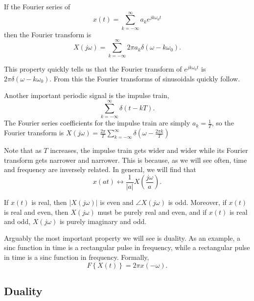 If the Fourier series of
\begin{equation}
    x(t) = \sum_{k=-\infty}^{\infty} a_k e^{jk\omega_0 t}
\end{equation}
then the Fourier transform is
\begin{equation}
    X(j\omega) = \sum_{k=-\infty}^{\infty} 2\pi a_k \delta(\omega - k\omega_0).
\end{equation}

This property quickly tells us that the Fourier transform
of $e^{jk\omega_0 t}$ is $2\pi \delta(\omega-k\omega_0)$.
From this the Fourier transforms of sinusoidals quickly follow.

Another important periodic signal is the impulse train,
\begin{equation}
    \sum_{k=-\infty}^{\infty} \delta(t - kT).
\end{equation}
The Fourier series coefficients for
the impulse train are simply $a_k = \frac{1}{T}$,
so the Fourier transform is
$X(j\omega) = \frac{2\pi}{T} \sum_{k=-\infty}^{\infty} \delta(\omega - \frac{2\pi k}{T})$

Note that as $T$ increases, the impulse train gets wider
and wider while its Fourier transform gets narrower and
narrower. This is because, as we will see often, time and
frequency are inversely related. In general, we will find
that
\begin{equation}
    x(at) \leftrightarrow \frac{1}{|a|}X(\frac{j\omega}{a}).
\end{equation}

If $x(t)$ is real, then $|X(j\omega)|$ is even and
$\angle X(j\omega)$ is odd. Moreover, if $x(t)$ is real
and even, then $X(j\omega)$ must be purely real and even,
and if $x(t)$ is real and odd, $X(j\omega)$ is purely
imaginary and odd.

Arguably the most important property we will see is duality.
As an example, a sinc function in time is a rectangular pulse
in frequency, while a rectangular pulse in time is a sinc
function in frequency. Formally,
\begin{equation}
    F\left\{ X(t) \right\} = 2\pi x(-\omega).
\end{equation}

\subsection{Duality}

